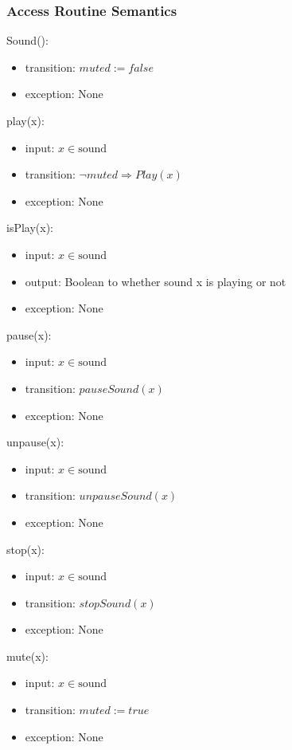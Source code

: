 \documentclass[12pt]{article}
\begin{document}
\subsubsection* {Access Routine Semantics}

\noindent Sound():
\begin{itemize}
  \item transition: $muted := false$
  \item exception: None
\end{itemize}

\noindent play(x):
\begin{itemize}
  \item input: $x \in \mbox{sound}$
  \item transition: $\lnot muted \Rightarrow Play(x)$
  \item exception: None
\end{itemize}

\noindent isPlay(x):
\begin{itemize}
  \item input: $x \in \mbox{sound}$
  \item output: Boolean to whether sound x is playing or not
  \item exception: None
\end{itemize}

\noindent pause(x):
\begin{itemize}
  \item input: $x \in \mbox{sound}$
  \item transition: $pauseSound(x)$
  \item exception: None
\end{itemize}

\noindent unpause(x):
\begin{itemize}
  \item input: $x \in \mbox{sound}$
  \item transition: $unpauseSound(x)$
  \item exception: None
\end{itemize}

\noindent stop(x):
\begin{itemize}
  \item input: $x \in \mbox{sound}$
  \item transition: $stopSound(x)$
  \item exception: None
\end{itemize}

\noindent mute(x):
\begin{itemize}
  \item input: $x \in \mbox{sound}$
  \item transition: $muted := true$
  \item exception: None
\end{itemize}
\end{document}

